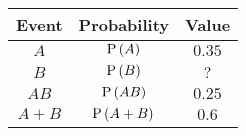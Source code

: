 \begin{tabular}{|c|c|c|} 
\hline
\textbf{Event} & \textbf{Probability} & \textbf{Value} \\
\hline
$A$ & $\text{P}\left(A\right)$ & $0.35$ \\
\hline
$B$ & $\text{P}\left(B\right)$ & $?$ \\
\hline
$AB$ & $\text{P}\left(AB\right)$ & $0.25$ \\
\hline
$A + B$ & $\text{P}\left(A + B\right)$ & $0.6$ \\
\hline
\end{tabular}